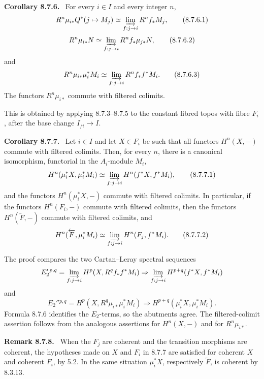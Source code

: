 \documentclass[11pt]{article}
\newenvironment{statement}[1]{\par\medskip\noindent\textbf{#1.}\ }{\par\medskip}
\newenvironment{remarktext}[1]{\par\medskip\noindent\textbf{#1.}\ }{\par\medskip}
\begin{document}
\begin{statement}{Corollary 8.7.6}
For every \(i\in I\) and every integer \(n\),
\[
 R^n\mu_{i*}Q^*(j\mapsto M_j)
 \simeq
 \varinjlim_{f:j\to i}R^nf_*M_j, \tag{8.7.6.1}
\]
\[
 R^n\mu_{i*}N
 \simeq
 \varinjlim_{f:j\to i}R^nf_*\mu_{j*}N, \tag{8.7.6.2}
\]
and
\[
 R^n\mu_{i*}\mu_i^*M_i
 \simeq
 \varinjlim_{f:j\to i}R^nf_*f^*M_i. \tag{8.7.6.3}
\]
The functors \(R^n\mu_{i*}\) commute with filtered colimits.
\end{statement}
This is obtained by applying 8.7.3--8.7.5 to the constant fibred topos with fibre \(F_i\), after the base change \(I_{/i}\to I\).

\begin{statement}{Corollary 8.7.7}
Let \(i\in I\) and let \(X\in F_i\) be such that all functors \(H^n(X,-)\) commute with filtered colimits. Then, for every \(n\), there is a canonical isomorphism, functorial in the \(A_i\)-module \(M_i\),
\[
 H^n(\mu_i^*X,\mu_i^*M_i)
 \simeq
 \varinjlim_{f:j\to i}H^n(f^*X,f^*M_i), \tag{8.7.7.1}
\]
and the functors \(H^n(\mu_i^*X,-)\) commute with filtered colimits. In particular, if the functors \(H^n(F_i,-)\) commute with filtered colimits, then the functors \(H^n(\overleftarrow F,-)\) commute with filtered colimits, and
\[
 H^n(\overleftarrow F,\mu_i^*M_i)
 \simeq
 \varinjlim_{f:j\to i}H^n(F_j,f^*M_i). \tag{8.7.7.2}
\]
\end{statement}
The proof compares the two Cartan--Leray spectral sequences
\[
 E_2'{}^{p,q}=\varinjlim_{f:j\to i}H^p(X,R^qf_*f^*M_i)
 \Rightarrow
 \varinjlim_{f:j\to i}H^{p+q}(f^*X,f^*M_i)
\]
and
\[
 E_2''{}^{p,q}=H^p(X,R^q\mu_{i*}\mu_i^*M_i)
 \Rightarrow H^{p+q}(\mu_i^*X,\mu_i^*M_i).
\]
Formula 8.7.6 identifies the \(E_2\)-terms, so the abutments agree. The filtered-colimit assertion follows from the analogous assertions for \(H^n(X,-)\) and for \(R^n\mu_{i*}\).

\begin{remarktext}{Remark 8.7.8}
When the \(F_j\) are coherent and the transition morphisms are coherent, the hypotheses made on \(X\) and \(F_i\) in 8.7.7 are satisfied for coherent \(X\) and coherent \(F_i\), by 5.2. In the same situation \(\mu_i^*X\), respectively \(\overleftarrow F\), is coherent by 8.3.13.
\end{remarktext}
\end{document}
